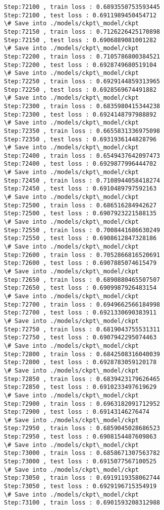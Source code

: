 \documentclass[11pt]{article}
\begin{document}
\begin{Verbatim}[commandchars=\\\{\}]
Step:72100 , train loss : 0.6893550753593445
Step:72100 , test loss : 0.6911989450454712
\# Save into ./models/ckpt\_model/ckpt
Step:72150 , train loss : 0.7126226425170898
Step:72150 , test loss : 0.6906889081001282
\# Save into ./models/ckpt\_model/ckpt
Step:72200 , train loss : 0.7105786800384521
Step:72200 , test loss : 0.6928749680519104
\# Save into ./models/ckpt\_model/ckpt
Step:72250 , train loss : 0.6929144859313965
Step:72250 , test loss : 0.6928569674491882
\# Save into ./models/ckpt\_model/ckpt
Step:72300 , train loss : 0.6835980415344238
Step:72300 , test loss : 0.6924148797988892
\# Save into ./models/ckpt\_model/ckpt
Step:72350 , train loss : 0.6655831336975098
Step:72350 , test loss : 0.6931936144828796
\# Save into ./models/ckpt\_model/ckpt
Step:72400 , train loss : 0.6549437642097473
Step:72400 , test loss : 0.6929877996444702
\# Save into ./models/ckpt\_model/ckpt
Step:72450 , train loss : 0.7108944058418274
Step:72450 , test loss : 0.6910489797592163
\# Save into ./models/ckpt\_model/ckpt
Step:72500 , train loss : 0.686516284942627
Step:72500 , test loss : 0.6907923221588135
\# Save into ./models/ckpt\_model/ckpt
Step:72550 , train loss : 0.7008441686630249
Step:72550 , test loss : 0.6908612847328186
\# Save into ./models/ckpt\_model/ckpt
Step:72600 , train loss : 0.7052866816520691
Step:72600 , test loss : 0.6907885074615479
\# Save into ./models/ckpt\_model/ckpt
Step:72650 , train loss : 0.6890880465507507
Step:72650 , test loss : 0.6909987926483154
\# Save into ./models/ckpt\_model/ckpt
Step:72700 , train loss : 0.6949662566184998
Step:72700 , test loss : 0.6921330690383911
\# Save into ./models/ckpt\_model/ckpt
Step:72750 , train loss : 0.6819043755531311
Step:72750 , test loss : 0.6907942295074463
\# Save into ./models/ckpt\_model/ckpt
Step:72800 , train loss : 0.6842508316040039
Step:72800 , test loss : 0.6928783059120178
\# Save into ./models/ckpt\_model/ckpt
Step:72850 , train loss : 0.6839423179626465
Step:72850 , test loss : 0.6910233497619629
\# Save into ./models/ckpt\_model/ckpt
Step:72900 , train loss : 0.6963182091712952
Step:72900 , test loss : 0.69143146276474
\# Save into ./models/ckpt\_model/ckpt
Step:72950 , train loss : 0.6859045028686523
Step:72950 , test loss : 0.6908154487609863
\# Save into ./models/ckpt\_model/ckpt
Step:73000 , train loss : 0.6858671307563782
Step:73000 , test loss : 0.6915077567100525
\# Save into ./models/ckpt\_model/ckpt
Step:73050 , train loss : 0.6919119358062744
Step:73050 , test loss : 0.6929196715354919
\# Save into ./models/ckpt\_model/ckpt
Step:73100 , train loss : 0.6901593208312988

\end{Verbatim}
\end{document}
